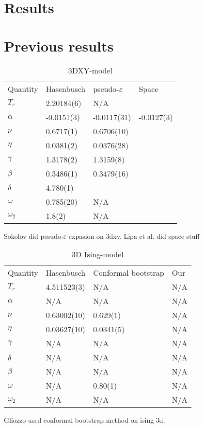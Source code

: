 %
\section{Results}
\section{Previous results}
\begin{table}[!htpb]
\begin{center}
\begin{tabular}{l l l l }
  Quantity 	& Hasenbusch 	& pseudo-$\varepsilon$ 	& Space	\\
  $T_c$		& 2.20184(6)	& N/A		&	\\
  $\alpha $	& -0.0151(3)	& -0.0117(31)	&-0.0127(3)\\
  $\nu	  $     & 0.6717(1) 	& 0.6706(10)	&	\\
  $\eta   $     & 0.0381(2) 	& 0.0376(28) 	&	\\
  $\gamma $	& 1.3178(2) 	& 1.3159(8)	&	\\
  $\beta  $     & 0.3486(1) 	& 0.3479(16)	&	\\
  $\delta $	& 4.780(1) 	& 		&	\\
  $\omega $     & 0.785(20) 	& N/A			&	\\
  $\omega_2$ 	& 1.8(2) 	& N/A			&	\\
\end{tabular}
\end{center}
\caption{3DXY-model }
\end{table}
Sokolov did pesudo-$\varepsilon$ expasion on 3dxy.\cite{Sokolov2016}
Lipa et al. did space stuff \cite{Lipa2003}
\begin{table}[!htpb]
\begin{center}
\begin{tabular}{l l l l}
  Quantity  & Hasenbusch & Conformal bootstrap& Our\\
  $T_c$	    & 4.511523(3)& N/A		& N/A\\
  $\alpha $ & N/A        & N/A		& N/A\\
  $\nu	  $ & 0.63002(10)& 0.629(1)	& N/A\\
  $\eta   $ & 0.03627(10)& 0.0341(5)	& N/A\\
  $\gamma $ & N/A        & N/A		& N/A\\
  $\delta $ & N/A        & N/A		& N/A\\
  $\beta  $ & N/A        & N/A		& N/A\\
  $\omega $ & N/A        & 0.80(1)	& N/A\\
  $\omega_2$& N/A        & N/A		& N/A\\
\end{tabular}
\end{center}
\caption{3D Ising-model }
\end{table}
Gliozzo used conformal bootstrap method on ising 3d.\cite{Gliozzi2014}

